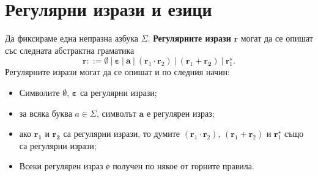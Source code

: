 \section{Регулярни изрази и езици}

Да фиксираме една непразна азбука $\Sigma$.
{\bf Регулярните изрази} $\mathbf{r}$ могат да се опишат със следната абстрактна граматика
\[\mathbf{r} ::= \bm{\emptyset}\ |\ \bm{\varepsilon}\ |\ \mathbf{a}\ |\ (\bm{r}_1 \cdot \bm{r}_2)\ |\ (\bm{r}_1 + \bm{r_2})\ |\ \bm{r}^\star_1.\]
Регулярните изрази могат да се опишат и по следния начин:
\begin{itemize}
\item 
  Символите $\bm{\emptyset}$, $\bm{\varepsilon}$ са регулярни изрази;
\item
  за всяка буква $a \in \Sigma$, символът $\bm{a}$ е регулярен израз;
\item
  ако $\mathbf{r_1}$ и $\mathbf{r_2}$ са регулярни изрази, то думите $(\bm{r}_1 \cdot \bm{r}_2)$, $(\bm{r}_1 + \bm{r}_2)$ и $\bm{r}^\star_1$
  също са регулярни изрази;
\item
  Всеки регулярен израз е получен по някое от горните правила.
\end{itemize}

